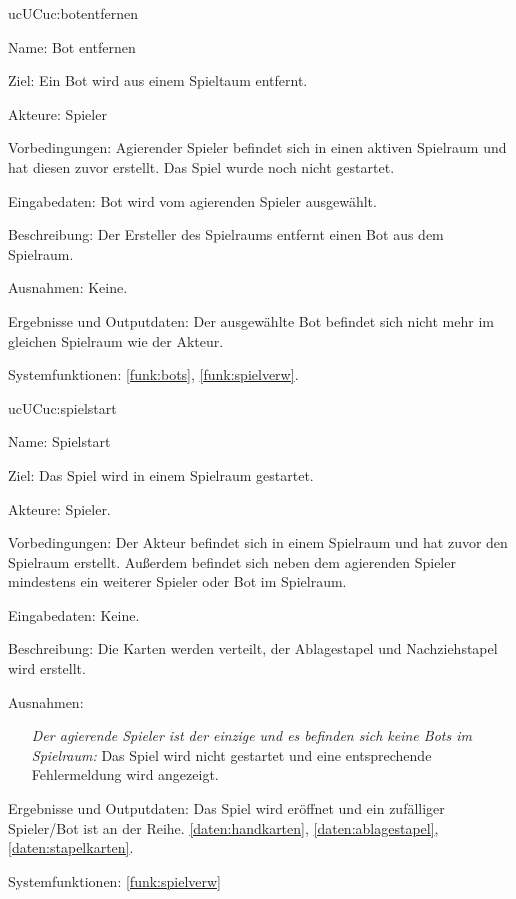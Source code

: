 \begin{description}[leftmargin=5em, style=sameline]
	\begin{lhp}{uc}{UC}{uc:botentfernen}
		\item [Name:]Bot entfernen
		\item [Ziel:]Ein Bot wird aus einem Spieltaum entfernt.
		\item [Akteure:] Spieler
		\item [Vorbedingungen:]Agierender Spieler befindet sich in einen aktiven Spielraum und hat diesen zuvor erstellt. Das Spiel wurde noch nicht gestartet.
		\item [Eingabedaten:]Bot wird vom agierenden Spieler ausgewählt.
		\item [Beschreibung:]Der Ersteller des Spielraums entfernt einen Bot aus dem Spielraum. 
		\item [Ausnahmen:]  Keine.
		\item [Ergebnisse und Outputdaten:] Der ausgewählte Bot befindet sich nicht mehr im gleichen Spielraum wie der Akteur.
		\item [Systemfunktionen:] 
		\ref{funk:bots}, \ref{funk:spielverw}.
	\end{lhp}
	
	\begin{lhp}{uc}{UC}{uc:spielstart}
		\item [Name:]Spielstart
		\item [Ziel:]Das Spiel wird in einem Spielraum gestartet.
		\item [Akteure:]Spieler.
		\item [Vorbedingungen:]Der Akteur befindet sich in einem Spielraum und hat zuvor den Spielraum erstellt. Außerdem befindet sich neben dem agierenden Spieler mindestens ein weiterer Spieler oder Bot im Spielraum.
		\item [Eingabedaten:]Keine.
		\item [Beschreibung:]Die Karten werden verteilt, der Ablagestapel und Nachziehstapel wird erstellt. 
		\item [Ausnahmen:] \hfill
		\begin{itemize}
		    \item []
		    \textit{Der agierende Spieler ist der einzige und es befinden sich keine Bots im Spielraum: } Das Spiel wird nicht gestartet und eine entsprechende Fehlermeldung wird angezeigt.
		\end{itemize}
		\item [Ergebnisse und Outputdaten:]Das Spiel wird eröffnet und ein zufälliger Spieler/Bot ist an der Reihe. \ref{daten:handkarten},
		\ref{daten:ablagestapel},
		\ref{daten:stapelkarten}.
		\item [Systemfunktionen:]
		\ref{funk:spielverw}
	\end{lhp}
	

\end{description}
